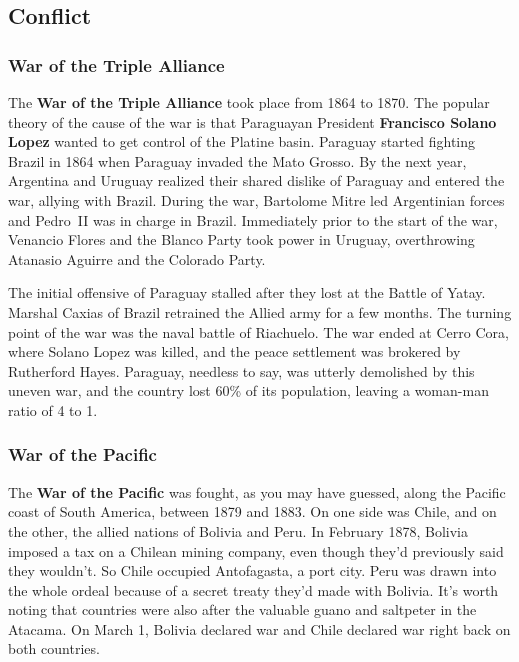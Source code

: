 \subsection*{Conflict}

\subsubsection*{War of the Triple Alliance}

The \textbf{War of the Triple Alliance} took place from 1864 to 1870.
The popular theory of the cause of the war is that Paraguayan President \textbf{Francisco Solano Lopez}
wanted to get control of the Platine basin.
Paraguay started fighting Brazil in 1864 when Paraguay invaded the Mato Grosso.
By the next year, Argentina and Uruguay realized their shared dislike of Paraguay and entered the war,
allying with Brazil.
During the war, Bartolome Mitre led Argentinian forces and Pedro~II was in charge in Brazil.
Immediately prior to the start of the war,
Venancio Flores and the Blanco Party took power in Uruguay, overthrowing Atanasio Aguirre and the Colorado Party.

The initial offensive of Paraguay stalled after they lost at the Battle of Yatay.
Marshal Caxias of Brazil retrained the Allied army for a few months.
The turning point of the war was the naval battle of Riachuelo.
The war ended at Cerro Cora, where Solano Lopez was killed,
and the peace settlement was brokered by Rutherford Hayes.
Paraguay, needless to say, was utterly demolished by this uneven war,
and the country lost 60\% of its population, leaving a woman-man ratio of 4 to 1.

\subsubsection*{War of the Pacific}

The \textbf{War of the Pacific} was fought, as you may have guessed, along the Pacific coast of South America,
between 1879 and 1883.
On one side was Chile, and on the other, the allied nations of Bolivia and Peru.
In February 1878, Bolivia imposed a tax on a Chilean mining company,
even though they'd previously said they wouldn't.
So Chile occupied Antofagasta, a port city.
Peru was drawn into the whole ordeal because of a secret treaty they'd made with Bolivia.
It's worth noting that countries were also after the valuable guano and saltpeter in the Atacama.
On March 1, Bolivia declared war and Chile declared war right back on both countries.

